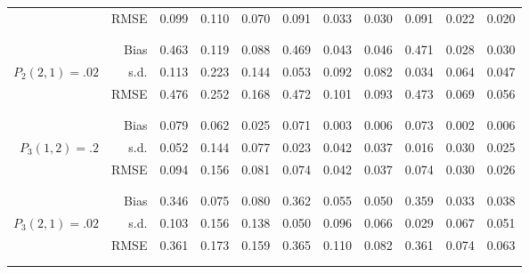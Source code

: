 \begin{tabular}{rr@{\hskip .3in}ccc@{\hskip .4in}ccc@{\hskip .4in}ccc}
&RMSE & 0.099&0.110&0.070&0.091&0.033&0.030&0.091&0.022&0.020 \\
\\\\&Bias & 0.463&0.119&0.088&0.469&0.043&0.046&0.471&0.028&0.030 \\
$ P_{2}(2,1)=.02 $& s.d. & 0.113&0.223&0.144&0.053&0.092&0.082&0.034&0.064&0.047 \\
&RMSE & 0.476&0.252&0.168&0.472&0.101&0.093&0.473&0.069&0.056 \\
\\\\&Bias & 0.079&0.062&0.025&0.071&0.003&0.006&0.073&0.002&0.006 \\
$ P_{3}(1,2)=.2 $& s.d. & 0.052&0.144&0.077&0.023&0.042&0.037&0.016&0.030&0.025 \\
&RMSE & 0.094&0.156&0.081&0.074&0.042&0.037&0.074&0.030&0.026 \\
\\\\&Bias & 0.346&0.075&0.080&0.362&0.055&0.050&0.359&0.033&0.038 \\
$ P_{3}(2,1)=.02 $& s.d. & 0.103&0.156&0.138&0.050&0.096&0.066&0.029&0.067&0.051 \\
&RMSE & 0.361&0.173&0.159&0.365&0.110&0.082&0.361&0.074&0.063 \\
\\\\\end{tabular}
